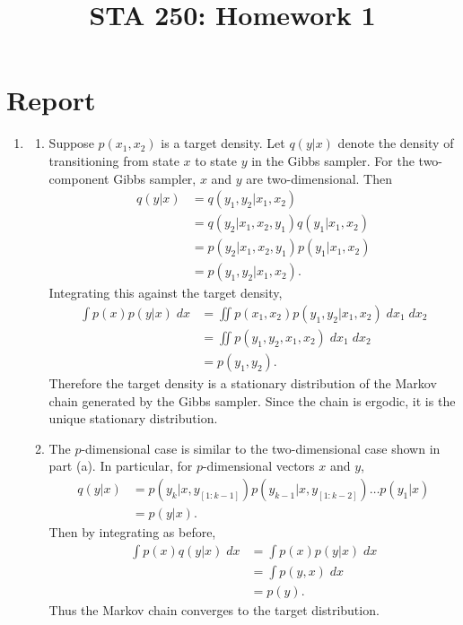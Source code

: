 

\pagestyle{name}
\title{STA 250: Homework 1}


\chapter{Report}
\begin{enumerate}
\item
    \begin{enumerate}
    \item
    Suppose $p(x_1, x_2)$ is a target density.
    Let $q(y \vert x)$ denote the density of transitioning from state $x$ to
    state $y$ in the Gibbs sampler. 
    For the two-component Gibbs sampler, $x$ and $y$ are two-dimensional.
    Then
    \begin{align*}
        q(y \vert x)
        &=
        q(y_1, y_2 \vert x_1, x_2)
        \\ &=
        q(y_2 \vert x_1, x_2, y_1) q(y_1 \vert x_1, x_2)
        \\ &=
        p(y_2 \vert x_1, x_2, y_1) p(y_1 \vert x_1, x_2)
        \\ &=
        p(y_1, y_2 \vert x_1, x_2).
    \end{align*}
    Integrating this against the target density,
    \begin{align*}
        \int p(x) p(y \vert x) \;dx
        &=
        \iint p(x_1, x_2) p(y_1, y_2 \vert x_1, x_2) \;dx_1 \;dx_2
        \\ &=
        \iint p(y_1, y_2, x_1, x_2) \;dx_1 \;dx_2
        \\ &=
        p(y_1, y_2).
    \end{align*}
    Therefore the target density is a stationary distribution of the Markov
    chain generated by the Gibbs sampler. Since the chain is ergodic, it is the
    unique stationary distribution.

    \item
    The $p$-dimensional case is similar to the two-dimensional case shown in
    part (a). In particular, for $p$-dimensional vectors $x$ and $y$,
    \begin{align*}
        q(y \vert x)
        &=
        p(y_k \vert x, y_{[1:k - 1]}) 
        p(y_{k-1} \vert x, y_{[1:k-2]})
        \ldots
        p(y_1 \vert x)
        \\ &=
        p(y \vert x).
    \end{align*}
    Then by integrating as before,
    \begin{align*}
        \int p(x) q(y \vert x) \;dx
        &=
        \int p(x) p(y \vert x) \;dx
        \\ &=
        \int p(y, x) \;dx
        \\ &=
        p(y).
    \end{align*}
    Thus the Markov chain converges to the target distribution.
    \end{enumerate}


\end{enumerate}
